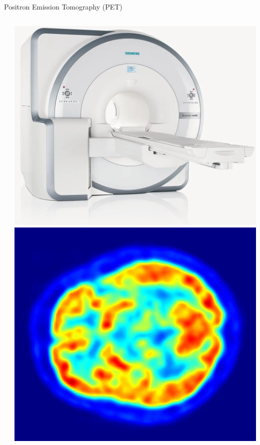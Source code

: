 \documentclass[aspectratio=169]{beamer}
\begin{document}
\begin{frame}[t]{Positron Emission Tomography (PET)}
\begin{columns}
\begin{column}{0.7\textwidth}
\begin{itemize}
			\end{itemize}
		\end{column}
		\begin{column}{0.25\textwidth}
			\includegraphics[width=\linewidth]{pet_machine2.png} \\ [0.5cm]
			\includegraphics[width=\linewidth]{pet_image.jpg}
		\end{column}
	\end{columns}

\end{frame}
\end{document}
